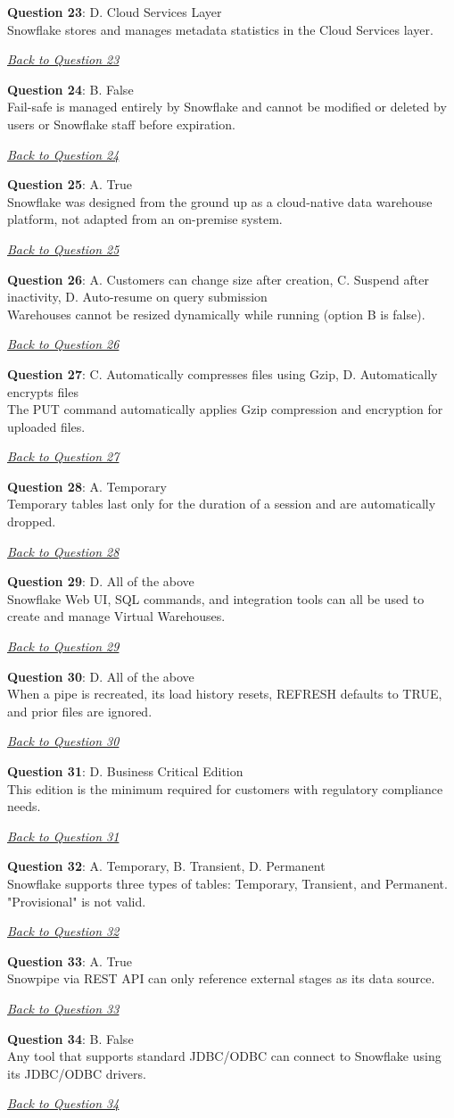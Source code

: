\documentclass[12pt]{article}
\newcommand{\answer}[2]{%
  \textbf{Question #1}\label{ans:#1}: #2\par
  \smallskip\emph{\hyperref[q:#1]{Back to Question #1}}\par\medskip
}
\begin{document}
\answer{23}{D. Cloud Services Layer\\
Snowflake stores and manages metadata statistics in the Cloud Services layer.}

\answer{24}{B. False\\
Fail-safe is managed entirely by Snowflake and cannot be modified or deleted by users or Snowflake staff before expiration.}

\answer{25}{A. True\\
Snowflake was designed from the ground up as a cloud-native data warehouse platform, not adapted from an on-premise system.}

\answer{26}{A. Customers can change size after creation, C. Suspend after inactivity, D. Auto-resume on query submission\\
Warehouses cannot be resized dynamically while running (option B is false).}

\answer{27}{C. Automatically compresses files using Gzip, D. Automatically encrypts files\\
The PUT command automatically applies Gzip compression and encryption for uploaded files.}

\answer{28}{A. Temporary \\
Temporary tables last only for the duration of a session and are automatically dropped.}

\answer{29}{D. All of the above \\
Snowflake Web UI, SQL commands, and integration tools can all be used to create and manage Virtual Warehouses.}

\answer{30}{D. All of the above \\
When a pipe is recreated, its load history resets, REFRESH defaults to TRUE, and prior files are ignored.}

\answer{31}{D. Business Critical Edition \\
This edition is the minimum required for customers with regulatory compliance needs.}

\answer{32}{A. Temporary, B. Transient, D. Permanent \\
Snowflake supports three types of tables: Temporary, Transient, and Permanent. "Provisional" is not valid.}

\answer{33}{A. True \\
Snowpipe via REST API can only reference external stages as its data source.}

\answer{34}{B. False \\
Any tool that supports standard JDBC/ODBC can connect to Snowflake using its JDBC/ODBC drivers.}
\end{document}

